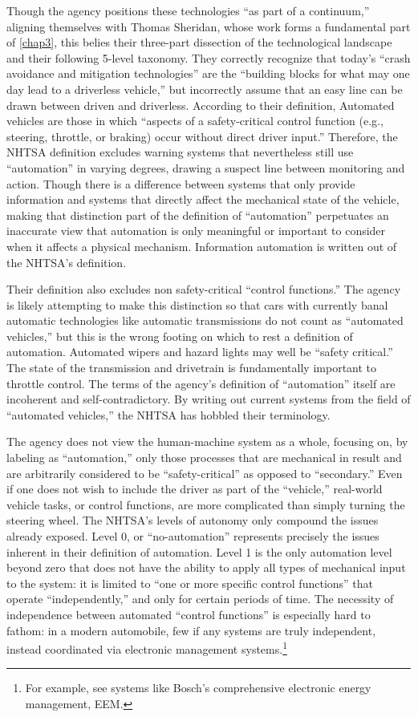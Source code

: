 Though the agency positions these technologies ``as part of a
continuum,''\cite{???} aligning themselves with Thomas Sheridan, whose
work forms a fundamental part of \ref{chap3}, this belies
their three-part dissection of the technological landscape and their
following 5-level taxonomy. They correctly recognize that today's
``crash avoidance and mitigation technologies'' are the ``building blocks
for what may one day lead to a driverless vehicle,'' but incorrectly
assume that an easy line can be drawn between driven and
driverless.\cite{???} According to their definition, Automated
vehicles are those in which ``aspects of a safety-critical control
function (e.g., steering, throttle, or braking) occur without direct
driver input.''\cite{???} Therefore, the NHTSA definition excludes warning
systems that nevertheless still use ``automation'' in varying degrees,
drawing a suspect line between monitoring and action. Though there is
a difference between systems that only provide information and systems
that directly affect the mechanical state of the vehicle, making that
distinction part of the definition of “automation” perpetuates an
inaccurate view that automation is only meaningful or important to
consider when it affects a physical mechanism. Information automation
is written out of the NHTSA's definition.

Their definition also excludes non safety-critical ``control
functions.'' The agency is likely attempting to make this distinction
so that cars with currently banal automatic technologies like
automatic transmissions do 
not count as ``automated vehicles,'' but this is the wrong footing on
which to rest a definition of automation. Automated wipers and hazard
lights may well be ``safety critical.'' The state of the transmission
and drivetrain is fundamentally important to throttle control. The
terms of the agency's definition of ``automation'' itself are incoherent
and self-contradictory. By writing out current systems from the field
of ``automated vehicles,'' the NHTSA has hobbled their terminology.

The agency does not view the human-machine system as a whole, focusing
on, by labeling as ``automation,'' only those processes that are
mechanical in result and are arbitrarily considered to be
``safety-critical'' as opposed to ``secondary.'' Even if one does not
wish to include 
the driver as part of the ``vehicle,'' real-world vehicle tasks, or
control functions, are more complicated than simply turning the
steering wheel. The NHTSA's levels of autonomy only compound the
issues already exposed. Level 0, or “no-automation” represents
precisely the issues inherent in their definition of automation. Level
1 is the only automation level beyond zero that does not have the
ability to apply all types of mechanical input to the system: it is
limited to ``one or more specific control functions'' that operate
``independently,'' and only for certain periods of time.\cite{???} The
necessity of independence between automated ``control functions'' is
especially hard to fathom: in a modern automobile, few if any systems
are truly independent, instead coordinated via electronic management
systems.\footnote{For example, see systems like Bosch's comprehensive
  electronic energy management, EEM.} 

